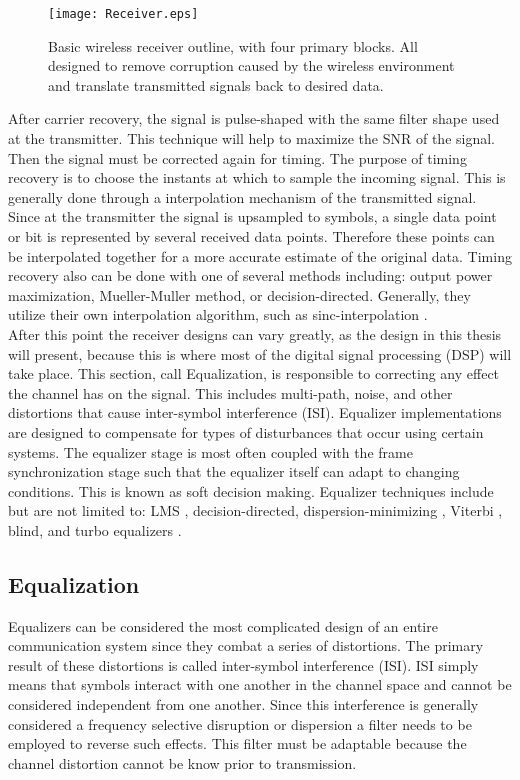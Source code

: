 \begin{figure}[!ht]\label{Receiver_Blocks}
\centering
\texttt{[image: Receiver.eps]}
\caption{Basic wireless receiver outline, with four primary blocks.  All designed to remove corruption caused by the wireless environment and translate transmitted signals back to desired data.}
\end{figure}

After carrier recovery, the signal is pulse-shaped with the same filter shape used at the transmitter.  This technique will help to maximize the SNR of the signal.  Then the signal must be corrected again for timing.  The purpose of timing recovery is to choose the instants at which to sample the incoming signal.  This is generally done through a interpolation mechanism of the transmitted signal.  Since at the transmitter the signal is upsampled to symbols, a single data point or bit is represented by several received data points.  Therefore these points can be interpolated together for a more accurate estimate of the original data.  Timing recovery also can be done with one of several methods including: output power maximization, Mueller-Muller method, or decision-directed.  Generally, they utilize their own interpolation algorithm, such as sinc-interpolation \cite{9}.\\

After this point the receiver designs can vary greatly, as the design in this thesis will present, because this is where most of the digital signal processing (DSP) will take place.  This section, call Equalization, is responsible to correcting any effect the channel has on the signal. This includes multi-path, noise, 	and other distortions that cause inter-symbol interference (ISI).  Equalizer implementations are designed to compensate for types of disturbances that occur using certain systems.  The equalizer stage is most often coupled with the frame synchronization stage such that the equalizer itself can adapt to changing conditions.  This is known as soft decision making.  Equalizer techniques include but are not limited to: LMS , decision-directed, dispersion-minimizing \cite{9}, Viterbi \cite{viterbi}, blind, and turbo equalizers \cite{turbo}.\\  

\subsection{Equalization}

Equalizers can be considered the most complicated design of an entire communication system since they combat a series of distortions.  The primary result of these distortions is called inter-symbol interference (ISI).  ISI simply means that symbols interact with one another in the channel space and cannot be considered independent from one another.  Since this interference is generally considered a frequency selective disruption or dispersion a filter needs to be employed to reverse such effects.  This filter must be adaptable because the channel distortion cannot be know prior to transmission.\\  

